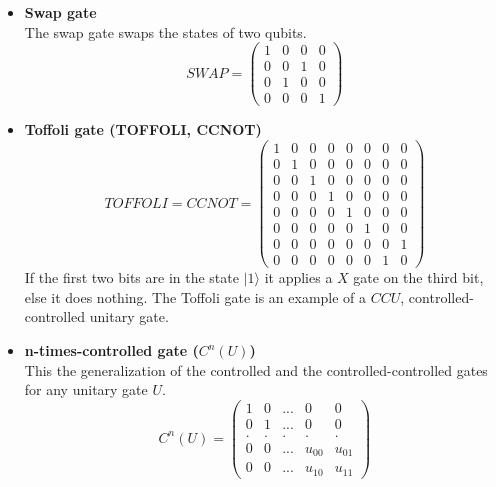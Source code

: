 \begin{itemize}
    \item \textbf{Swap gate} \\
    The swap gate swaps the states of two qubits.
    \begin{equation}
        SWAP = \left( \begin{array}{cccc} 1 & 0 & 0 & 0 \\
                                          0 & 0 & 1 & 0 \\
                                          0 & 1 & 0 & 0 \\
                                          0 & 0 & 0 & 1 \end{array} \right)
    \end{equation}
    
    \item \textbf{Toffoli gate (TOFFOLI, CCNOT)}
    \begin{equation}
        TOFFOLI = CCNOT = \left( \begin{array}{cccccccc} 1 & 0 & 0 & 0 & 0 & 0 & 0 & 0 \\
                                                         0 & 1 & 0 & 0 & 0 & 0 & 0 & 0 \\
                                                         0 & 0 & 1 & 0 & 0 & 0 & 0 & 0 \\
                                                         0 & 0 & 0 & 1 & 0 & 0 & 0 & 0 \\
                                                         0 & 0 & 0 & 0 & 1 & 0 & 0 & 0 \\
                                                         0 & 0 & 0 & 0 & 0 & 1 & 0 & 0 \\
                                                         0 & 0 & 0 & 0 & 0 & 0 & 0 & 1 \\
                                                         0 & 0 & 0 & 0 & 0 & 0 & 1 & 0 \end{array} \right)
    \end{equation}
    If the first two bits are in the state $|1\rangle$ it applies a $X$ gate on the third bit, else it does nothing. The Toffoli gate is an example of a $CCU$, controlled-controlled unitary gate.
    
    \item \textbf{n-times-controlled gate ($C^n(U)$)} \\
    This the generalization of the controlled and the controlled-controlled gates for any unitary gate $U$.
    \begin{equation}
        C^n(U) = \left( \begin{array} {ccccc} 1 & 0 & ... & 0 & 0 \\
                                             0 & 1 & ... & 0 & 0 \\
                                             . & . & . & . & . \\
                                             0 & 0 & ... & u_{00} & u_{01} \\
                                             0 & 0 & ... & u_{10} & u_{11} \end{array} \right)
    \end{equation}
    

\end{itemize}
